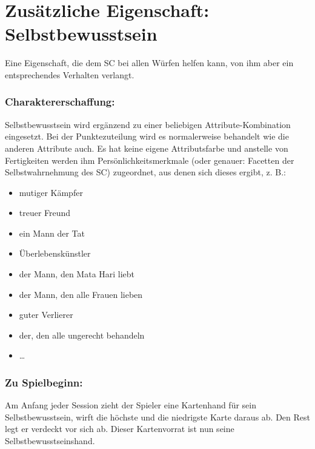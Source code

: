\section{Zusätzliche Eigenschaft: Selbstbewusstsein}
Eine Eigenschaft, die dem SC bei allen Würfen helfen kann, von ihm aber ein entsprechendes Verhalten verlangt.

\subsubsection{Charaktererschaffung:}

Selbstbewusstsein wird ergänzend zu einer beliebigen Attribute-Kombination eingesetzt. Bei der Punktezuteilung wird es normalerweise behandelt wie die anderen Attribute auch. Es hat keine eigene Attributsfarbe und anstelle von Fertigkeiten werden ihm Persönlichkeitsmerkmale (oder genauer: Facetten der Selbstwahrnehmung des SC) zugeordnet, aus denen sich dieses ergibt, z. B.:

\begin{itemize}
\item mutiger Kämpfer
\item treuer Freund
\item ein Mann der Tat
\item Überlebenskünstler
\item der Mann, den Mata Hari liebt
\item der Mann, den alle Frauen lieben
\item guter Verlierer
\item der, den alle ungerecht behandeln
\item \dots
\end{itemize}

\subsubsection{Zu Spielbeginn:}
Am Anfang jeder Session zieht der Spieler eine Kartenhand für sein Selbstbewusstsein, wirft die höchste und die niedrigste Karte daraus ab. Den Rest legt er verdeckt vor sich ab. Dieser Kartenvorrat ist nun seine Selbstbewusstseinshand.

